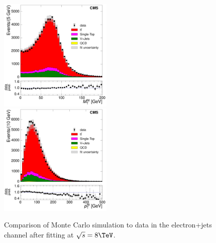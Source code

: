 \begin{figure}[hbtp]
     \includegraphics[width=0.48\textwidth]{Chapters/04_Analysis/04b_XSections/images/control_plots/after_fit/8TeV/EPlusJets_patType1CorrectedPFMet_MT_2orMoreBtags_with_ratio.pdf}\\     
	 \includegraphics[width=0.48\textwidth]{Chapters/04_Analysis/04b_XSections/images/control_plots/after_fit/8TeV/EPlusJets_patType1CorrectedPFMet_WPT_2orMoreBtags_with_ratio.pdf}\hfill
	 \caption{Comparison of Monte Carlo simulation to data in the electron+jets channel after fitting at
	 $\sqrt{s}=8\TeV$.}
     \label{fig:data_mc_comparison_after_fit_8TeV_electron}
\end{figure}

